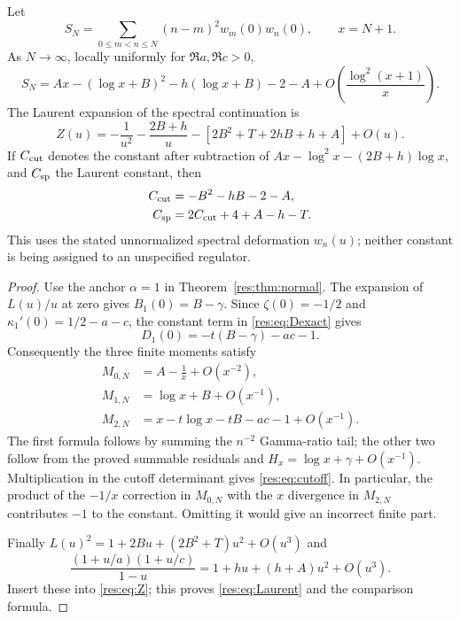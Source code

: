 \begin{theorem}
\label{res:thm:cutoff}
Let
\[
 S_N=\sum_{0\leq m<n\leq N}(n-m)^2w_m(0)w_n(0),\qquad x=N+1.
\]
As $N\to\infty$, locally uniformly for $\Re a,\Re c>0$,
\begin{equation}
 \boxed{S_N=A x-(\log x+B)^2-h(\log x+B)-2-A
             +O\left(\frac{\log^2(x+1)}x\right).}
 \label{res:eq:cutoff}
\end{equation}
The Laurent expansion of the spectral continuation is
\begin{equation}
 Z(u)=-\frac1{u^2}-\frac{2B+h}u
       -\left[2B^2+T+2hB+h+A\right]+O(u).
 \label{res:eq:Laurent}
\end{equation}
If $C_{\rm cut}$ denotes the constant after subtraction of
$Ax-\log^2x-(2B+h)\log x$, and $C_{\rm sp}$ the Laurent constant,
then
\begin{align}
 C_{\rm cut}&=-B^2-hB-2-A,\label{res:eq:Ccut}\\
 C_{\rm sp}&=2C_{\rm cut}+4+A-h-T.\label{res:eq:compare}
\end{align}
This uses the stated unnormalized spectral deformation $w_n(u)$;
neither constant is being assigned to an unspecified regulator.
\end{theorem}

\begin{proof}
Use the anchor $\alpha=1$ in Theorem~\ref{res:thm:normal}.
The expansion of $L(u)/u$ at zero gives
$B_1(0)=B-\gamma$.  Since $\zeta(0)=-1/2$ and
$\kappa_1'(0)=1/2-a-c$, the constant term in
\eqref{res:eq:Dexact} gives
\[
 D_1(0)=-t(B-\gamma)-ac-1.
\]
Consequently the three finite moments satisfy
\begin{align*}
 M_{0,N}&=A-\frac1x+O(x^{-2}),\\
 M_{1,N}&=\log x+B+O(x^{-1}),\\
 M_{2,N}&=x-t\log x-tB-ac-1+O(x^{-1}).
\end{align*}
The first formula follows by summing the $n^{-2}$ Gamma-ratio
tail; the other two follow from the proved summable residuals and
$H_x=\log x+\gamma+O(x^{-1})$.  Multiplication in the cutoff
determinant gives \eqref{res:eq:cutoff}.  In particular, the product
of the $-1/x$ correction in $M_{0,N}$ with the $x$ divergence in
$M_{2,N}$ contributes $-1$ to the constant.  Omitting it would give
an incorrect finite part.

Finally $L(u)^2=1+2Bu+(2B^2+T)u^2+O(u^3)$ and
\[
 \frac{(1+u/a)(1+u/c)}{1-u}
   =1+hu+(h+A)u^2+O(u^3).
\]
Insert these into \eqref{res:eq:Z}; this proves
\eqref{res:eq:Laurent} and the comparison formula.
\end{proof}

